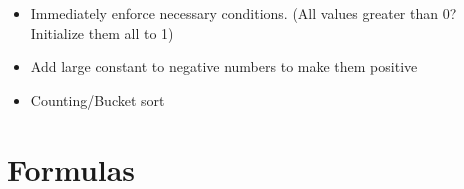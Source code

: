 \documentclass[9pt,a4paper,twocolumn,landscape,oneside]{amsart}
\newenvironment{myitemize}
{ \begin{itemize}[leftmargin=.5cm]
    \setlength{\itemsep}{0pt}
    \setlength{\parskip}{0pt}
    \setlength{\parsep}{0pt}     }
{ \end{itemize}                  }
\begin{document}
\begin{multicols*}{3}
\begin{myitemize}
                    \begin{itemize}
                        \item Minimize something instead of maximizing
                    \end{itemize}
                \item Immediately enforce necessary conditions. (All values greater than 0? Initialize them all to 1)
                \item Add large constant to negative numbers to make them positive
                \item Counting/Bucket sort
            \end{myitemize}

    \section{Formulas}




\end{multicols*}
\end{document}
